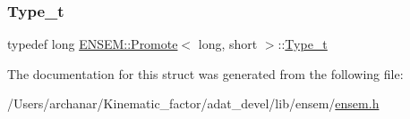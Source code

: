 \subsubsection{\texorpdfstring{Type\_t}{Type\_t}\hspace{0.1cm}{\footnotesize\ttfamily [2/2]}}
{\footnotesize\ttfamily typedef long \mbox{\hyperlink{structENSEM_1_1Promote}{E\+N\+S\+E\+M\+::\+Promote}}$<$ long, short $>$\+::\mbox{\hyperlink{structENSEM_1_1Promote_3_01long_00_01short_01_4_ad4dfbe27e4b99b58da27d3d26440cb0c}{Type\+\_\+t}}}



The documentation for this struct was generated from the following file\+:\begin{DoxyCompactItemize}
\item 
/\+Users/archanar/\+Kinematic\+\_\+factor/adat\+\_\+devel/lib/ensem/\mbox{\hyperlink{lib_2ensem_2ensem_8h}{ensem.\+h}}\end{DoxyCompactItemize}
